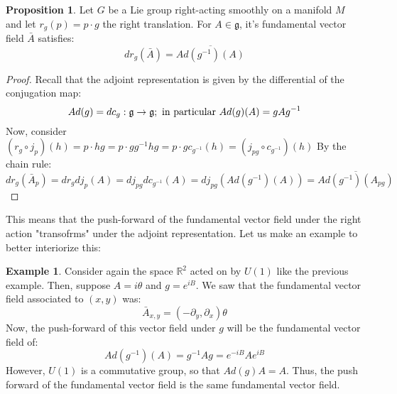 \documentclass[12pt,a4paper]{report}
\theoremstyle{definition}
\theoremstyle{Theorem}
\newtheorem{Prop}[Def]{Proposition}
\theoremstyle{definition}
\newtheorem{Ex}[Def]{Example}
\theoremstyle{definition}
\begin{document}
		\begin{Prop}
			Let $G$ be a Lie group right-acting smoothly on a manifold $M$ and let $r_g(p)=p\cdot g$ the right translation. For $A\in\mathfrak{g}$, it's fundamental vector field $\bar{A}$ satisfies:
			$$dr_g(\bar{A})=\overline{Ad(g^{-1})(A)}$$
		\end{Prop}
		\begin{proof}
			Recall that the adjoint representation is given by the differential of the conjugation map:
			$$Ad(g)=dc_g:\mathfrak{g}\rightarrow\mathfrak{g};\hbox{ in particular }Ad(g)(A)=gAg^{-1}$$
			Now, consider $(r_g\circ j_p)(h)=p\cdot hg=p\cdot gg^{-1}hg=p\cdot g c_{g^{-1}}(h)=(j_{pg}\circ c_{g^{-1}})(h)$
			By the chain rule:
			$$dr_g(\bar{A}_p)=dr_gdj_p(A)=dj_{pg}dc_{g^{-1}}(A)=dj_{pg}(Ad(g^{-1})(A))=\overline{Ad(g^{-1})(A_{pg})}$$
		\end{proof}
		This means that the push-forward of the fundamental vector field under the right action "transofrms" under the adjoint representation. Let us make an example to better interiorize this:
		\begin{Ex}
			Consider again the space $\mathbb{R}^2$ acted on by $U(1)$ like the previous example. Then, suppose $A=i\theta$ and $g=e^{iB}$. We saw that the fundamental vector field associated to $(x,y)$ was:
			$$\bar{A}_{x,y}=(-\partial_y,\partial_x)\theta$$
			Now, the push-forward of this vector field under $g$ will be the fundamental vector field of:
			$$Ad(g^{-1})(A)=g^{-1}Ag=e^{-iB}Ae^{iB}$$
			However, $U(1)$ is a commutative group, so that $Ad(g)A=A$. Thus, the push forward of the fundamental vector field is the same fundamental vector field.
		\end{Ex}
\end{document}
